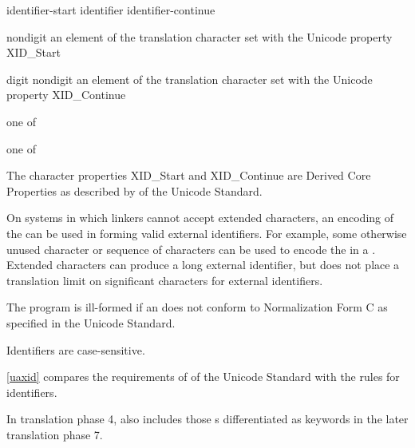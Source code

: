 %
\begin{bnf}
\br
    identifier-start\br
    identifier identifier-continue
\end{bnf}

\begin{bnf}
\br
    nondigit\br
    \textnormal{an element of the translation character set with the Unicode property XID_Start}
\end{bnf}

\begin{bnf}
\br
    digit\br
    nondigit\br
    \textnormal{an element of the translation character set with the Unicode property XID_Continue}
\end{bnf}

\begin{bnf}
 \textnormal{one of}\br
    \br
    \br
    \br
\end{bnf}

\begin{bnf}
 \textnormal{one of}\br
\end{bnf}

\pnum
{}%
%
\begin{note}
The character properties XID_Start and XID_Continue are Derived Core Properties
as described by  of the Unicode Standard.
\begin{footnote}
On systems in which linkers cannot accept extended
characters, an encoding of the  can be used in
forming valid external identifiers. For example, some otherwise unused
character or sequence of characters can be used to encode the
 in a . Extended
characters can produce a long external identifier, but \Cpp{} does not
place a translation limit on significant characters for external
identifiers.
\end{footnote}
\end{note}
The program is ill-formed
if an  does not conform to
Normalization Form C as specified in the Unicode Standard.
\begin{note}
Identifiers are case-sensitive.
\end{note}
\begin{note}
\ref{uaxid} compares the requirements of  of the Unicode Standard
with the \Cpp{} rules for identifiers.
\end{note}
\begin{note}
In translation phase 4,
 also includes
those s
differentiated as keywords
in the later translation phase 7.
\end{note}

